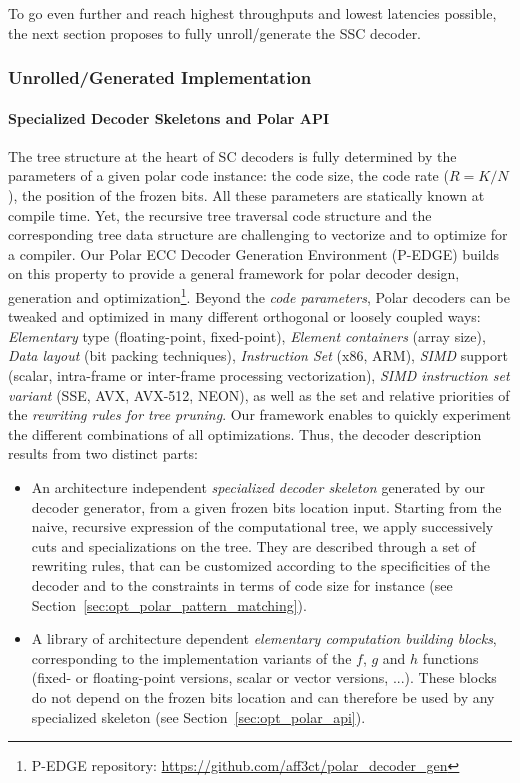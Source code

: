 To go even further and reach highest throughputs and lowest latencies possible,
the next section proposes to fully unroll/generate the SSC decoder.

\subsubsection{Unrolled/Generated Implementation}
\label{sec:opt_polar_pedge}

\paragraph{Specialized Decoder Skeletons and Polar API}

The tree structure at the heart of SC decoders is fully determined by the
parameters of a given polar code instance: the code size, the code rate ($R = K
/ N$), the position of the frozen bits. All these parameters are  statically
known at compile time. Yet, the recursive tree traversal code structure and the
corresponding tree data structure are challenging to vectorize and to optimize
for a compiler. Our Polar ECC Decoder Generation Environment (P-EDGE) builds on
this property to provide a general framework for polar decoder design,
generation and optimization\footnote{P-EDGE repository: \url{https://github.com/aff3ct/polar_decoder_gen}}.
Beyond the \emph{code parameters}, Polar decoders
can be tweaked and optimized in many different orthogonal or loosely coupled
ways: \emph{Elementary} type (floating-point, fixed-point),
\emph{Element containers} (array size), \emph{Data layout} (bit packing
techniques), \emph{Instruction Set} (x86, ARM\R), \emph{SIMD} support (scalar,
intra-frame or inter-frame processing vectorization), \emph{SIMD instruction set
variant} (SSE, AVX, AVX-512, NEON), as well as the set and relative priorities
of the \emph{rewriting rules for tree pruning}. Our framework enables to quickly
experiment the different combinations of all optimizations. Thus, the decoder
description results from two distinct parts:
\begin{itemize}
  \item An architecture independent \emph{specialized decoder skeleton}
    generated by our decoder generator, from a given frozen bits location input.
    Starting from the naive, recursive expression of the computational tree, we
    apply successively cuts and specializations on the tree. They are described
    through a set of rewriting rules, that can be customized according to the
    specificities of the decoder and to the constraints in terms of code size
    for instance (see Section~\ref{sec:opt_polar_pattern_matching}).
  \item A library of architecture dependent \emph{elementary computation
    building blocks}, corresponding to the implementation variants of the $f$,
    $g$ and $h$ functions (fixed- or floating-point versions, scalar or vector
    versions, ...). These blocks do not depend on the frozen bits location and
    can therefore be used by any specialized skeleton (see
    Section~\ref{sec:opt_polar_api}).
\end{itemize}

